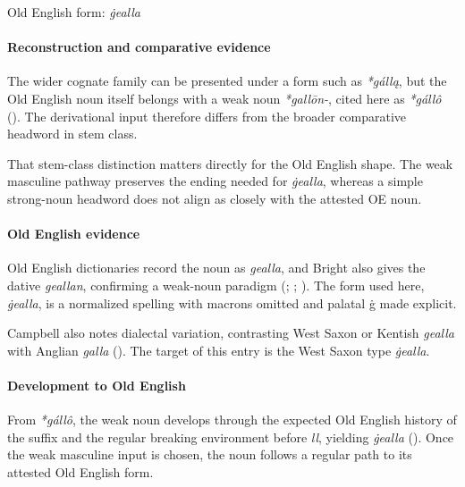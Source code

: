 \documentclass[
  british,
  a4paper,
]{article}
\begin{document}
Old English form: \emph{ġealla}

\paragraph{Reconstruction and comparative
evidence}\label{reconstruction-and-comparative-evidence-12}

The wider cognate family can be presented under a form such as
\emph{*gállą}, but the Old English noun itself belongs with a weak noun
\emph{*gallōn-}, cited here as \emph{*gállô}
(). The derivational input
therefore differs from the broader comparative headword in stem class.

That stem-class distinction matters directly for the Old English shape.
The weak masculine pathway preserves the ending needed for
\emph{ġealla}, whereas a simple strong-noun headword does not align as
closely with the attested OE noun.

\paragraph{Old English evidence}\label{old-english-evidence-12}

Old English dictionaries record the noun as \emph{gealla}, and Bright
also gives the dative \emph{geallan}, confirming a weak-noun paradigm
(;
;
). The form
used here, \emph{ġealla}, is a normalized spelling with macrons omitted
and palatal ġ made explicit.

Campbell also notes dialectal variation, contrasting West Saxon or
Kentish \emph{gealla} with Anglian \emph{galla}
(). The target of
this entry is the West Saxon type \emph{ġealla}.

\paragraph{Development to Old
English}\label{development-to-old-english-12}

From \emph{*gállô}, the weak noun develops through the expected Old
English history of the suffix and the regular breaking environment
before \emph{ll}, yielding \emph{ġealla}
(). Once the weak
masculine input is chosen, the noun follows a regular path to its
attested Old English form.
\end{document}
